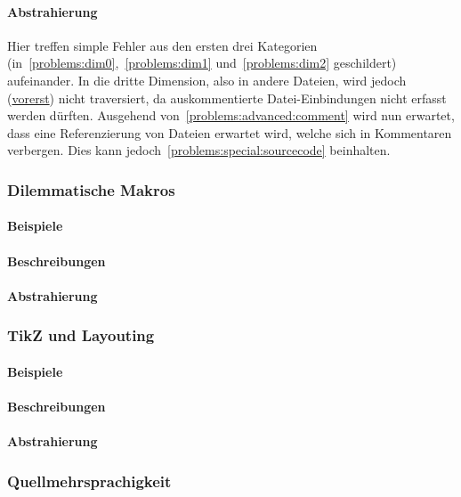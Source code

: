 \paragraph*{Abstrahierung}
Hier treffen simple Fehler aus den ersten drei Kategorien (in~\ref{problems:dim0},~\ref{problems:dim1} und~\ref{problems:dim2} geschildert) aufeinander. In die dritte Dimension, also in andere Dateien, wird jedoch (\hyperref[problems:special:comments]{vorerst}) nicht traversiert, da auskommentierte Datei-Einbindungen nicht erfasst werden dürften. 
Ausgehend von~\ref{problems:advanced:comment} wird nun erwartet, dass eine Referenzierung von Dateien erwartet wird, welche sich in Kommentaren verbergen. Dies kann jedoch~\ref{problems:special:sourcecode} beinhalten.


\subsubsection{Dilemmatische Makros}\label{problems:special:macrodilemma}%
\paragraph*{Beispiele}
\paragraph*{Beschreibungen}
\paragraph*{Abstrahierung}

\subsubsection{TikZ und Layouting}\label{problems:advanced:layouting}
\paragraph*{Beispiele}
\paragraph*{Beschreibungen}
\paragraph*{Abstrahierung}

\subsubsection{Quellmehrsprachigkeit}\label{problems:special:sourcecode}
